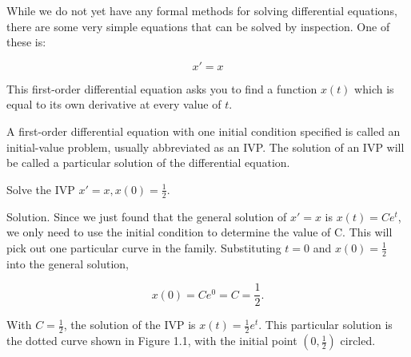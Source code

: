   While we do not yet have any formal methods for solving differential equations, there are some very simple equations that can be solved by inspection. One of these is:

  \[
    x' = x
  \]

  This first-order differential equation asks you to find a function $x(t)$ which is equal to its own derivative at every value of $t$.

  \begin{definition}
    A first-order differential equation with one initial condition specified is called an initial-value problem, usually abbreviated as an IVP. The solution of an IVP will be called a particular solution of the differential equation.
  \end{definition}

  \begin{problem}
    Solve the IVP $x'=x, x(0)=\frac{1}{2}$.

    Solution. Since we just found that the general solution of $x'=x$ is $x(t)=Ce^t$, we only need to use the initial condition to determine the value of C. This will pick out one particular curve in the family. Substituting $t=0$ and $x(0)=\frac{1}{2}$ into the general solution,

    \[
      x(0)=Ce^0=C=\frac{1}{2}.
    \]

    With $C=\frac{1}{2}$, the solution of the IVP is $x(t)=\frac{1}{2}e^t$. This particular solution is the dotted curve shown in Figure 1.1, with the initial point $(0,\frac{1}{2})$ circled.
  \end{problem}
